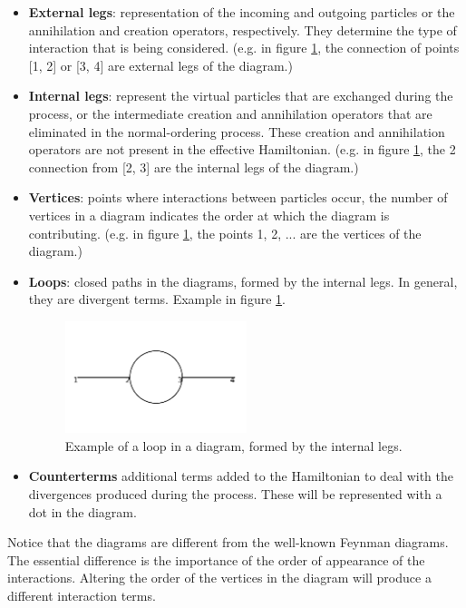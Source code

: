 \documentclass[11pt,a4paper,twoside,pdf]{article}
\numberwithin{equation}{section}
\begin{document}
\begin{itemize}
    \item \textbf{External legs}: representation of the incoming and outgoing particles or 
    the annihilation and creation operators, respectively. They determine the type 
    of interaction that is being considered. (e.g. in figure \ref{fig:loop_example},
    the connection of points [1, 2] or [3, 4] are external legs of the diagram.)
    \item \textbf{Internal legs}: represent the virtual particles that are exchanged during the
    process, or the intermediate creation and annihilation operators that are 
    eliminated in the normal-ordering process. These creation and annihilation operators
    are not present in the effective Hamiltonian. (e.g. in figure \ref{fig:loop_example},
    the 2 connection from [2, 3] are the internal legs of the diagram.)
    \item \textbf{Vertices}: points where interactions between particles occur, the number of
    vertices in a diagram indicates the order at which the diagram is contributing. 
    (e.g. in figure \ref{fig:loop_example}, the points 1, 2, ... are the vertices
    of the diagram.)
    \item \textbf{Loops}: closed paths in the diagrams, formed by the internal legs. In 
    general, they are divergent terms. Example in figure \ref{fig:loop_example}.
    \begin{figure}[h!]
        \centering
        \includegraphics[width=0.5\textwidth]{plots/order2/from_order1/3.png}
        \caption{Example of a loop in a diagram, formed by the internal legs.}
        \label{fig:loop_example}
    \end{figure}
    \item \textbf{Counterterms} additional terms added to the Hamiltonian to deal with the divergences
    produced during the process. These will be represented with a dot in the diagram.
\end{itemize}

Notice that the diagrams are different from the well-known Feynman diagrams\cite{Peskin:1995ev}.
The essential difference is the importance of the order of appearance
of the interactions. Altering
the order of the vertices in the diagram will produce a different interaction terms. 
\end{document}
